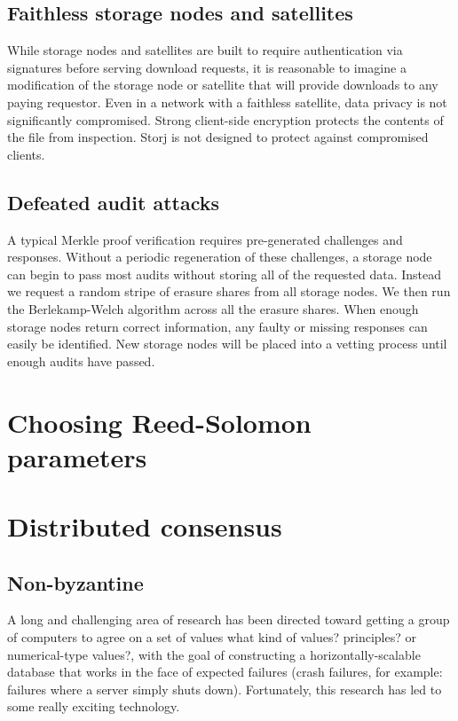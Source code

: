 \documentclass[11pt,fleqn,openany]{book}
\newcommand{\bs}[1]{{\color{red}#1}}
\begin{document}
\section{Faithless storage nodes and satellites}

While storage nodes and satellites are built to require authentication via
signatures before serving download requests, it is reasonable to imagine a
modification of the storage node or satellite that will provide downloads to
any paying requestor.
Even in a network with a faithless satellite, data privacy is not significantly
compromised.
Strong client-side encryption protects the contents of the file from
inspection.
Storj is not designed to protect against compromised clients.

\section{Defeated audit attacks}

A typical Merkle proof verification requires pre-generated challenges and
responses.
Without a periodic regeneration of these challenges, a storage node can begin
to pass most audits without storing all of the requested data.
Instead we request a random stripe of erasure shares from all storage nodes.
We then run the Berlekamp-Welch algorithm\cite{bw} across all the
erasure shares.
When enough storage nodes return correct information, any faulty or missing
responses can easily be identified.
New storage nodes will be placed into a vetting process until enough audits
have passed.

\chapter{Choosing Reed-Solomon parameters}





\chapter{Distributed consensus}

\section{Non-byzantine}

A long and challenging area of research has been directed toward getting a
group of computers to agree on a set of values
\bs{what kind of values? principles? or numerical-type values?},
with the goal of constructing a
horizontally-scalable database that works in the face of expected failures
(crash failures, for example: failures where a server simply shuts down).
Fortunately, this research has led to some really exciting technology.
\end{document}

